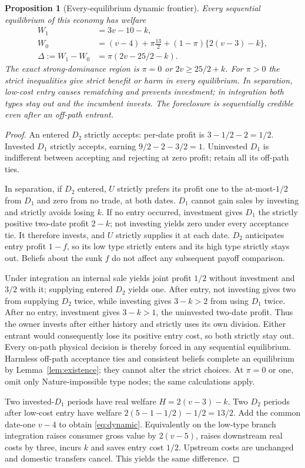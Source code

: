 \documentclass[11pt,a4paper]{article}
\numberwithin{equation}{section}
\newtheorem{proposition}[theorem]{Proposition}
\theoremstyle{definition}
\begin{document}
\begin{proposition}[Every-equilibrium dynamic frontier]\label{prop:dynamic}
Every sequential equilibrium of this economy has welfare
\begin{align}\label{eq:dynamic}
 W_1&=3v-10-k,\\
 W_0&=(v-4)+\pi\frac{13}{2}+(1-\pi)\{2(v-3)-k\},\nonumber\\
 \Delta:=W_1-W_0&=\pi(2v-25/2-k).\nonumber
\end{align}
The exact strong-dominance region is
$\pi=0$ or $2v\ge25/2+k$. For $\pi>0$ the strict inequalities give
strict benefit or harm in every equilibrium. In separation, low-cost
entry causes rematching and prevents investment; in integration both
types stay out and the incumbent invests. The foreclosure is sequentially
credible even after an off-path entrant.
\end{proposition}
\begin{proof}
An entered $D_2$ strictly accepts: per-date profit is
$3-1/2-2=1/2$. Invested $D_1$ strictly accepts, earning
$9/2-2-3/2=1$. Uninvested $D_1$ is indifferent between accepting and
rejecting at zero profit; retain all its off-path ties.

In separation, if $D_2$ entered, $U$ strictly prefers its profit one
to the at-most-$1/2$ from $D_1$ and zero from no trade, at both dates.
$D_1$ cannot gain sales by investing and strictly avoids losing $k$.
If no entry occurred, investment gives $D_1$ the strictly positive
two-date profit $2-k$; not investing yields zero under every acceptance
tie. It therefore invests, and $U$ strictly supplies it at each date.
$D_2$ anticipates entry profit $1-f$, so its low type strictly enters
and its high type strictly stays out. Beliefs about the sunk $f$ do
not affect any subsequent payoff comparison.

Under integration an internal sale yields joint profit $1/2$ without
investment and $3/2$ with it; supplying entered $D_2$ yields one.
After entry, not investing gives two from supplying $D_2$ twice, while
investing gives $3-k>2$ from using $D_1$ twice. After no entry,
investment gives $3-k>1$, the uninvested two-date profit. Thus the
owner invests after either history and strictly uses its own division.
Either entrant would consequently lose its positive entry cost, so both
strictly stay out. Every on-path physical decision is thereby forced
in any sequential equilibrium. Harmless off-path acceptance ties and
consistent beliefs complete an equilibrium by Lemma~\ref{lem:existence};
they cannot alter the strict choices. At $\pi=0$ or one, omit only
Nature-impossible type nodes; the same calculations apply.

Two invested-$D_1$ periods have real welfare $H=2(v-3)-k$.
Two $D_2$ periods after low-cost entry have welfare
$2(5-1-1/2)-1/2=13/2$. Add the common date-one $v-4$ to obtain
\eqref{eq:dynamic}. Equivalently on the low-type branch integration
raises consumer gross value by $2(v-5)$, raises downstream real costs
by three, incurs $k$ and saves entry cost $1/2$. Upstream costs are
unchanged and domestic transfers cancel. This yields the same difference.
\end{proof}
\end{document}
